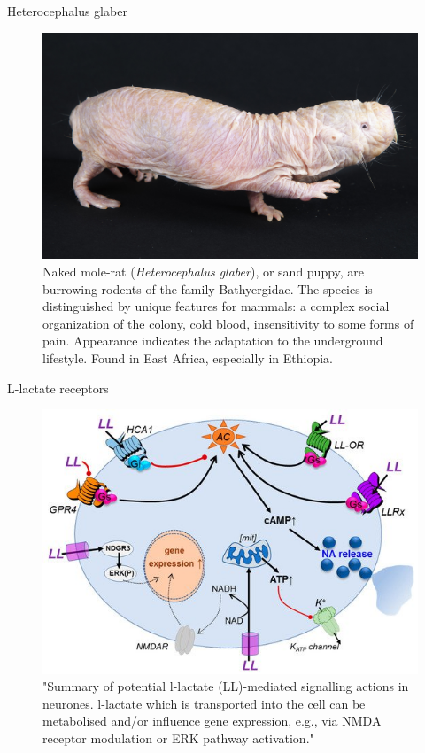 \documentclass[10pt]{beamer}
\begin{document}
\begin{frame}[fragile]{Heterocephalus glaber}

\begin{figure}[H]
\centering
\includegraphics[width=0.7\linewidth]{nakedmolerat.jpg}
\caption{Naked mole-rat (\textit{Heterocephalus glaber}), or sand puppy, are burrowing rodents of the family Bathyergidae. The species is distinguished by unique features for mammals: a complex social organization of the colony, cold blood, insensitivity to some forms of pain. Appearance indicates the adaptation to the underground lifestyle. Found in East Africa, especially in Ethiopia.}\label{fig:nakedmolerat}
\end{figure}

\end{frame}


\begin{frame}[fragile]{L-lactate receptors}
\begin{figure}[H]
\centering
\includegraphics[width=0.7\linewidth]{lactate_receptors.jpg}
\caption{"Summary of potential l-lactate (LL)-mediated signalling actions in neurones. l-lactate which is transported into the cell can be metabolised and/or influence gene expression, e.g., via NMDA receptor modulation or ERK pathway activation." \citep{Mosienko2018}}\label{fig:lactate_receptors}
\end{figure}
\end{frame}
\end{document}
